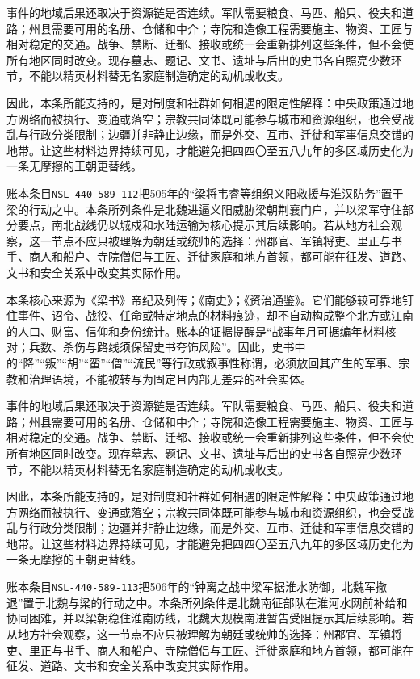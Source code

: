 事件的地域后果还取决于资源链是否连续。军队需要粮食、马匹、船只、役夫和道路；州县需要可用的名册、仓储和中介；寺院和造像工程需要施主、物资、工匠与相对稳定的交通。战争、禁断、迁都、接收或统一会重新排列这些条件，但不会使所有地区同时改变。现存墓志、题记、文书、遗址与后出的史书各自照亮少数环节，不能以精英材料替无名家庭制造确定的动机或收支。

因此，本条所能支持的，是对制度和社群如何相遇的限定性解释：中央政策通过地方网络而被执行、变通或落空；宗教共同体既可能参与城市和资源组织，也会受战乱与行政分类限制；边疆并非静止边缘，而是外交、互市、迁徙和军事信息交错的地带。让这些材料边界持续可见，才能避免把四四〇至五八九年的多区域历史化为一条无摩擦的王朝更替线。

账本条目\texttt{NSL-440-589-112}把505年的“梁将韦睿等组织义阳救援与淮汉防务”置于梁的行动之中。本条所列条件是北魏进逼义阳威胁梁朝荆襄门户，并以梁军守住部分要点，南北战线仍以城戍和水陆运输为核心提示其后续影响。若从地方社会观察，这一节点不应只被理解为朝廷或统帅的选择：州郡官、军镇将吏、里正与书手、商人和船户、寺院僧侣与工匠、迁徙家庭和地方首领，都可能在征发、道路、文书和安全关系中改变其实际作用。

本条核心来源为《梁书》帝纪及列传；《南史》；《资治通鉴》。它们能够较可靠地钉住事件、诏令、战役、任命或特定地点的材料痕迹，却不自动构成整个北方或江南的人口、财富、信仰和身份统计。账本的证据提醒是“战事年月可据编年材料核对；兵数、杀伤与路线须保留史书夸饰风险”。因此，史书中的“降”“叛”“胡”“蛮”“僧”“流民”等行政或叙事性称谓，必须放回其产生的军事、宗教和治理语境，不能被转写为固定且内部无差异的社会实体。

事件的地域后果还取决于资源链是否连续。军队需要粮食、马匹、船只、役夫和道路；州县需要可用的名册、仓储和中介；寺院和造像工程需要施主、物资、工匠与相对稳定的交通。战争、禁断、迁都、接收或统一会重新排列这些条件，但不会使所有地区同时改变。现存墓志、题记、文书、遗址与后出的史书各自照亮少数环节，不能以精英材料替无名家庭制造确定的动机或收支。

因此，本条所能支持的，是对制度和社群如何相遇的限定性解释：中央政策通过地方网络而被执行、变通或落空；宗教共同体既可能参与城市和资源组织，也会受战乱与行政分类限制；边疆并非静止边缘，而是外交、互市、迁徙和军事信息交错的地带。让这些材料边界持续可见，才能避免把四四〇至五八九年的多区域历史化为一条无摩擦的王朝更替线。

账本条目\texttt{NSL-440-589-113}把506年的“钟离之战中梁军据淮水防御，北魏军撤退”置于北魏与梁的行动之中。本条所列条件是北魏南征部队在淮河水网前补给和协同困难，并以梁朝稳住淮南防线，北魏大规模南进暂告受阻提示其后续影响。若从地方社会观察，这一节点不应只被理解为朝廷或统帅的选择：州郡官、军镇将吏、里正与书手、商人和船户、寺院僧侣与工匠、迁徙家庭和地方首领，都可能在征发、道路、文书和安全关系中改变其实际作用。

